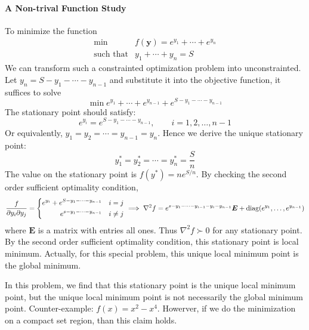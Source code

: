 \paragraph{A Non-trival Function Study}
To minimize the function
\[
\begin{array}{ll}
\min&f(\bm y)=e^{y_1}+\cdots+e^{y_n}\\
\mbox{such that}&y_1+\cdots+y_n=S
\end{array}
\]
We can transform such a constrainted optimization problem into unconstrainted. Let $y_n=S-y_1-\cdots-y_{n-1}$ and substitute it into the objective function, it suffices to solve
\[
\min e^{y_1}+\cdots+e^{y_{n-1}}+e^{S-y_1-\cdots-y_{n-1}}
\]
The stationary point should satisfy:
\[
e^{y_i}=e^{S-y_1-\cdots-y_{n-1}},
\qquad
i=1,2,\dots,n-1
\]
Or equivalently, $y_1=y_2=\cdots=y_{n-1}=y_n$. Hence we derive the unique stationary point:
\[
y_1^*=y_2^*=\cdots=y_n^*=\frac{S}{n}
\]
The value on the stationary point is $f(y^*)=ne^{S/n}$. By checking the second order sufficient optimality condition,
\[
\frac{f}{\partial y_i\partial y_j}=\left\{
\begin{aligned}
e^{y_i}+e^{S-y_1-\cdots-y_{n-1}}&\quad i=j\\
e^{s-y_1-\cdots-y_{n-1}}&\quad i\ne j
\end{aligned}
\right.\implies
\nabla^2 f=e^{s-y_1-\cdots-y_{i-1}-y_i-y_{n-1}}\bm E
+\operatorname{diag}(e^{y_1},\dots,e^{y_{n-1}})
\]
where $\bm E$ is a matrix with entries all ones. Thus $\nabla^2 f\succ0$ for any stationary point. By the second order sufficient optimality condition, this stationary point is local minimum. Actually, for this special problem, this unique local minimum point is the global minimum.
\begin{remark}
In this problem, we find that this stationary point is the unique local minimum point, but the unique local minimum point is not necessarily the global minimum point. Counter-example: $f(x)=x^2-x^4$. Howerver, if we do the minimization on a compact set region, than this claim holds.
\end{remark}









